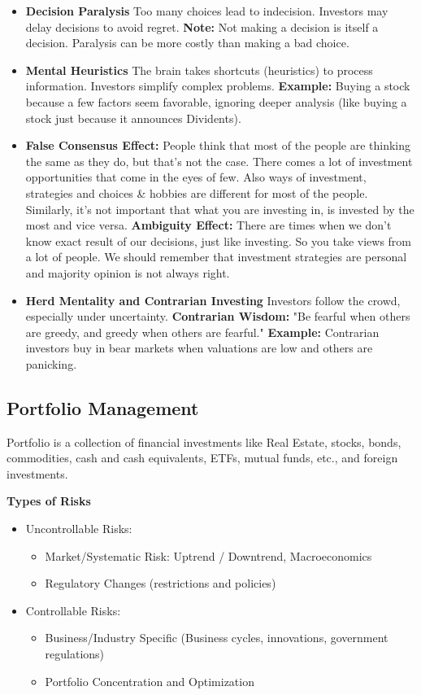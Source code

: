 \documentclass[12pt]{article}
\begin{document}
\begin{itemize}
  \item \textbf{Decision Paralysis}
  Too many choices lead to indecision. Investors may delay decisions to avoid regret.
  \textbf{Note:} Not making a decision is itself a decision. Paralysis can be more costly than making a bad choice.

  \item \textbf{Mental Heuristics}
  The brain takes shortcuts (heuristics) to process information. Investors simplify complex problems.
  \textbf{Example:} Buying a stock because a few factors seem favorable, ignoring deeper analysis (like buying a stock just because it announces Dividents).

  \item \textbf{False Consensus Effect:} People think that most of the people are thinking the same as they do, but that's not the case. There comes a lot of investment opportunities that come in the eyes of few. Also ways of investment, strategies and choices \& hobbies are different for most of the people. Similarly, it's not important that what you are investing in, is invested by the most and vice versa.
  \textbf{Ambiguity Effect:} There are times when we don't know exact result of our decisions, just like investing. So you take views from a lot of people. We should remember that investment strategies are personal and majority opinion is not always right.

  \item \textbf{Herd Mentality and Contrarian Investing}
  Investors follow the crowd, especially under uncertainty.
  \textbf{Contrarian Wisdom:} "Be fearful when others are greedy, and greedy when others are fearful."
  \textbf{Example:} Contrarian investors buy in bear markets when valuations are low and others are panicking.
\end{itemize}

\subsection{Portfolio Management}

Portfolio is a collection of financial investments like Real Estate, stocks, bonds, commodities, cash and cash equivalents, ETFs, mutual funds, etc., and foreign investments.

\textbf{Types of Risks}
\begin{itemize}
\item Uncontrollable Risks:
    \begin{itemize}
    \item Market/Systematic Risk: Uptrend / Downtrend, Macroeconomics
    \item Regulatory Changes (restrictions and policies)
    \end{itemize}
    
\item Controllable Risks:
    \begin{itemize}
    \item Business/Industry Specific (Business cycles, innovations, government regulations)
    \item Portfolio Concentration and Optimization
    \end{itemize}
\end{itemize}
\end{document}
